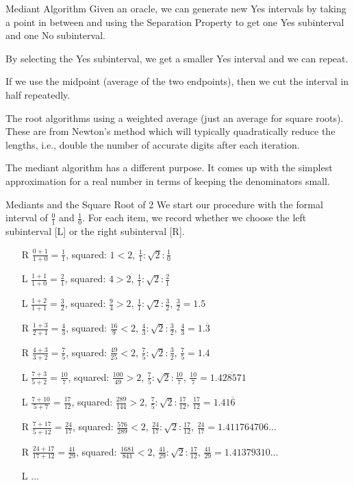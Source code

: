 \documentclass{beamer}
\begin{document}
\begin{frame}{Mediant Algorithm}
    Given an oracle, we can generate new Yes intervals by taking a point in between and using the Separation Property to get one Yes subinterval and one No subinterval. 

    By selecting the Yes subinterval, we get a smaller Yes interval and we can repeat. 

    If we use the midpoint (average of the two endpoints), then we cut the interval in half repeatedly. 

    The root algorithms using a weighted average (just an average for square roots). These are from Newton's method which will typically quadratically reduce the lengths, i.e., double the number of accurate digits after each iteration. 

    The mediant algorithm has a different purpose. It comes up with the simplest approximation for a real number in terms of keeping the denominators small. 
\end{frame}

\begin{frame}{Mediants and the Square Root of 2}
    We start our procedure with the formal interval of $\tfrac{0}{1}$ and $\tfrac{1}{0}$. For each item, we record whether we choose the left subinterval [L] or the right subinterval [R]. 


\begin{itemize}
    \item[R] $\tfrac{0+1}{1+0} = \tfrac{1}{1}$, squared: $1 < 2$,  $\tfrac{1}{1}:\sqrt{2}: \tfrac{1}{0} $ 
    \item[L] $\tfrac{1+1}{1+0} = \tfrac{2}{1}$, squared: $4 > 2$, $\tfrac{1}{1}:\sqrt{2}: \tfrac{2}{1}$
    \item[L] $\tfrac{1+2}{1+1} = \tfrac{3}{2}$, squared: $\tfrac{9}{4} > 2$, $\tfrac{1}{1}:\sqrt{2}: \tfrac{3}{2}$,  $\frac{3}{2} = 1.5$
    \item[R] $\tfrac{1+3}{2+1} = \tfrac{4}{3}$, squared: $\tfrac{16}{9} < 2$, $\tfrac{4}{3}:\sqrt{2}: \tfrac{3}{2}$, $\frac{4}{3} = 1.\overline{3}$
    \item[R] $\tfrac{4+3}{3+2} = \tfrac{7}{5}$, squared: $\tfrac{49}{25} < 2$, 
    $\tfrac{7}{5}:\sqrt{2}: \tfrac{3}{2}$,  $\frac{7}{5} = 1.4$
    \item[L] $\tfrac{7+3}{5+2} = \tfrac{10}{7}$, squared: $\tfrac{100}{49} > 2$, 
    $\tfrac{7}{5}:\sqrt{2}: \tfrac{10}{7}$,  $\frac{10}{7} = 1.\overline{428571}$
    \item[L] $\tfrac{7+10}{5+7} = \tfrac{17}{12}$, squared: $\tfrac{289}{144} > 2$, 
    $\tfrac{7}{5}:\sqrt{2}: \tfrac{17}{12}$,  $\frac{17}{12} = 1.41\overline{6}$
    \item[R] $\tfrac{7+17}{5+12} = \tfrac{24}{17}$, squared: $\tfrac{576}{289} < 2$, 
    $\tfrac{24}{17}:\sqrt{2}: \tfrac{17}{12}$,  $\frac{24}{17} = 1.411764706\ldots$
    \item[R] $\tfrac{24+17}{17+12} = \tfrac{41}{29}$, squared: $\tfrac{1681}{841} < 2$, 
    $\tfrac{41}{29}:\sqrt{2}: \tfrac{17}{12}$,  $\frac{41}{29} = 1.41379310\ldots$
    \item[L] $\ldots$
\end{itemize}
\end{frame}
\end{document}
